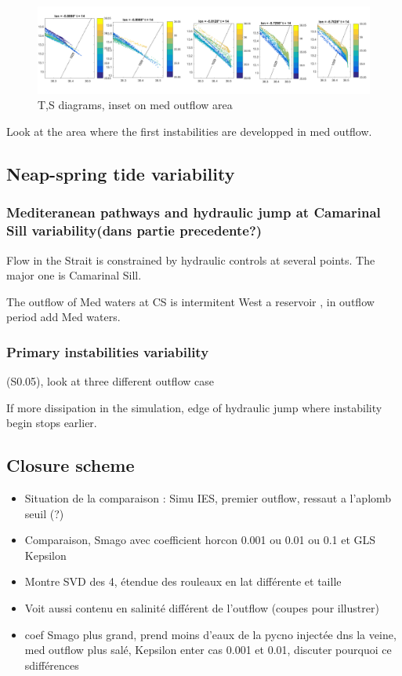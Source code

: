 \begin{figure}[!h]
 \includegraphics[width=\textwidth]{./GBR3D/TS_coupesCso14h.png}
 \caption {T,S diagrams, inset on med outflow area}
\end{figure}

Look at the area where the first instabilities are developped in med outflow.

\subsection{Neap-spring tide variability}
\subsubsection{Mediteranean pathways and hydraulic jump at Camarinal Sill variability(dans partie precedente?)}

Flow in the Strait is constrained by hydraulic controls at several points. The major one is Camarinal Sill.

The outflow of Med waters at CS is intermitent
West a reservoir , in outflow period add Med waters.




\subsubsection{Primary instabilities variability}

(S0.05), look at three different outflow case








If more dissipation in the simulation, edge of hydraulic jump where instability begin stops earlier.



\subsection{Closure scheme}

\begin{itemize}
\item Situation de la comparaison : Simu IES, premier outflow, ressaut a l'aplomb seuil (?)
\item Comparaison, Smago avec coefficient horcon 0.001 ou 0.01 ou 0.1  et GLS Kepsilon
\item Montre SVD des 4, étendue des rouleaux en lat différente et taille
\item Voit aussi contenu en salinité différent de l'outflow (coupes pour illustrer)
\item coef Smago plus grand, prend moins d'eaux de la pycno injectée dns la veine, med outflow plus salé, Kepsilon enter cas 0.001 et 0.01, discuter pourquoi ce sdifférences
\end{itemize}


